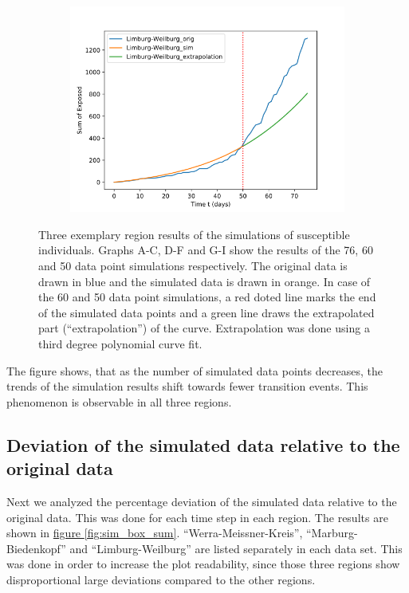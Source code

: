 \begin{figure}[h]
\begin{subfigure}[b]{0.3\textwidth}
		\includegraphics[width=\textwidth]{./figures/50d/10_Limburg-Weilburg.png}	
		\caption{}
	\end{subfigure}
	\caption{Three exemplary region results of the simulations of susceptible individuals. Graphs A-C, D-F and G-I
		show the results of the 76, 60 and 50 data point simulations respectively.
		The original data is drawn in blue and the simulated data is drawn in orange. In case
		of the 60 and 50 data point simulations, a red doted line marks the end of the simulated data points
		and a green line draws the extrapolated part (``extrapolation'') of the curve.
		Extrapolation was done using a third degree polynomial curve fit.
		}
	\label{fig:76_sim_expl}
\end{figure}

The figure shows, that as the number of simulated data points decreases, the trends of the simulation results shift towards
fewer transition events. This phenomenon is observable in all three regions.



\subsection{Deviation of the simulated data relative to the original data}
Next we analyzed the percentage deviation of the simulated data relative to the original data. This was done
for each time step in each region. The results are shown in \hyperref[fig:sim_box_sum]{figure \ref*{fig:sim_box_sum}}.
``Werra-Meissner-Kreis'', ``Marburg-Biedenkopf'' and ``Limburg-Weilburg'' are listed separately in each data set.
This was done in order to increase the plot readability, since those three regions show disproportional large deviations compared
to the other regions.\newline

